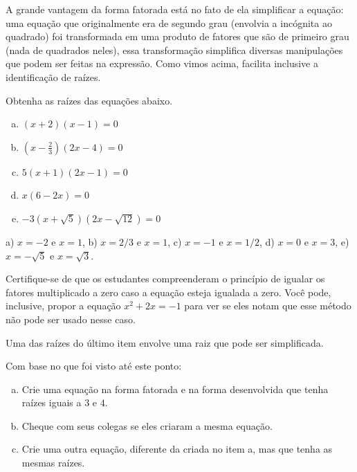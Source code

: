 \documentclass[main.tex]{subfiles}
\begin{document}
A grande vantagem da forma fatorada está no fato de ela simplificar a equação: uma equação que originalmente era de segundo grau (envolvia a incógnita ao quadrado) foi transformada em uma produto de fatores que são de primeiro grau (nada de quadrados neles), essa transformação simplifica diversas manipulações que podem ser feitas na expressão. Como vimos acima, facilita inclusive a identificação de raízes.

\begin{questao}
Obtenha as raízes das equações abaixo.
\begin{enumerate}[a)]
\item $(x+2)(x-1)=0$
\item $(x-\frac{2}{3})(2x-4)=0$
\item $5(x+1)(2x-1)=0$
\item $x(6-2x)=0$
\item $-3(x+\sqrt{5})(2x-\sqrt{12})=0$
\end{enumerate}
\end{questao}

\begin{gabarito}
	\begin{gabaritoQuestao}
        a) $x=-2$ e $x=1$, b) $x=2/3$ e $x=1$, c) $x=-1$ e $x=1/2$, d) $x=0$ e $x=3$, e) $x=-\sqrt{5}$ e $x=\sqrt{3}$.
	\end{gabaritoQuestao}
\end{gabarito}

\paraTutores

Certifique-se de que os estudantes compreenderam o princípio de igualar os fatores multiplicado a zero caso a equação esteja igualada a zero. Você pode, inclusive, propor a equação $x^2+2x=-1$ para ver se eles notam que esse método não pode ser usado nesse caso.

Uma das raízes do último item envolve uma raiz que pode ser simplificada.

\paraAmbos

\begin{reflita}
Com base no que foi visto até este ponto:
\begin{enumerate}[a)]
\item Crie uma equação na forma fatorada e na forma desenvolvida que tenha raízes iguais a $3$ e $4$.
\item Cheque com seus colegas se eles criaram a mesma equação.
\item Crie uma outra equação, diferente da criada no item a, mas que tenha as mesmas raízes.
\end{enumerate}
\end{reflita}
\end{document}
